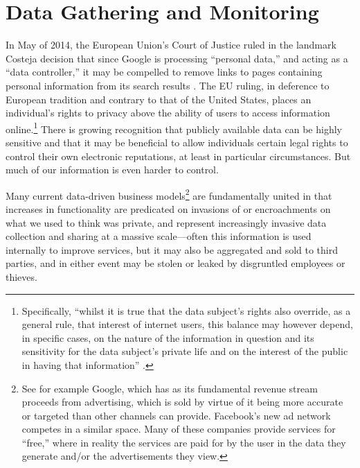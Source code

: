 \section{Data Gathering and Monitoring} 


 In May of 2014, the European
Union's Court of Justice 
ruled in the landmark Costeja decision that since Google is processing
``personal data,'' and acting as a ``data controller,'' it may be
compelled to remove links to pages containing personal information
from its search results \cite{ICO}. The EU ruling, in deference to European
tradition and contrary to that of the United States, places an
individual's rights to privacy above the ability of users to access
information online.\footnote{Specifically, ``whilst it is true that the
data subject's rights also override, as a general rule, that interest
of internet users, this balance may however depend, in specific cases,
on the nature of the information in question and its sensitivity for
the data subject's private life and on the interest of the public in
having that information'' \cite{COJCosteja}.} There is growing recognition that publicly
available data can be highly sensitive and that it may be beneficial
to allow individuals certain legal rights to control their own
electronic reputations, at least in particular circumstances. But much of our
information is even harder to control.

Many current data-driven business models\footnote{See for example
  Google, which has as its fundamental revenue stream proceeds from
  advertising, which is sold by virtue of it being more accurate or
  targeted than other channels can provide. Facebook's new ad network
  competes in a similar space. Many of these companies provide
  services for ``free,'' where in reality the services are paid for by
the user in the data they generate and/or the advertisements they
view.} are fundamentally united in that increases in
functionality are predicated on invasions of or encroachments on what
we used to think was private, and represent increasingly invasive data
collection and sharing at a massive scale---often this information is
used internally to improve services, but it may also be aggregated and
sold to third parties, and in either event may be stolen or leaked by
disgruntled employees or thieves. %

